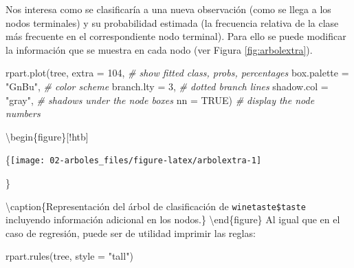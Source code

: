 \documentclass[
  spanish,
]{book}
\newenvironment{Shaded}{\begin{snugshade}}{\end{snugshade}}
\newcommand{\AttributeTok}[1]{\textcolor[rgb]{0.77,0.63,0.00}{#1}}
\newcommand{\CommentTok}[1]{\textcolor[rgb]{0.56,0.35,0.01}{\textit{#1}}}
\newcommand{\ConstantTok}[1]{\textcolor[rgb]{0.00,0.00,0.00}{#1}}
\newcommand{\DecValTok}[1]{\textcolor[rgb]{0.00,0.00,0.81}{#1}}
\newcommand{\FunctionTok}[1]{\textcolor[rgb]{0.00,0.00,0.00}{#1}}
\newcommand{\NormalTok}[1]{#1}
\newcommand{\StringTok}[1]{\textcolor[rgb]{0.31,0.60,0.02}{#1}}
\theoremstyle{break}
\theoremstyle{definition}
\theoremstyle{definition}
\theoremstyle{definition}
\theoremstyle{definition}
\theoremstyle{remark}
\begin{document}
Nos interesa como se clasificaría a una nueva observación (como se llega a los nodos terminales) y su probabilidad estimada (la frecuencia relativa de la clase más frecuente en el correspondiente nodo terminal). Para ello se puede modificar la información que se muestra en cada nodo (ver Figura \ref{fig:arbolextra}).

\begin{Shaded}
\begin{Highlighting}[]
\FunctionTok{rpart.plot}\NormalTok{(tree, }
           \AttributeTok{extra =} \DecValTok{104}\NormalTok{,          }\CommentTok{\# show fitted class, probs, percentages}
           \AttributeTok{box.palette =} \StringTok{"GnBu"}\NormalTok{, }\CommentTok{\# color scheme}
           \AttributeTok{branch.lty =} \DecValTok{3}\NormalTok{,       }\CommentTok{\# dotted branch lines}
           \AttributeTok{shadow.col =} \StringTok{"gray"}\NormalTok{,  }\CommentTok{\# shadows under the node boxes}
           \AttributeTok{nn =} \ConstantTok{TRUE}\NormalTok{)            }\CommentTok{\# display the node numbers }
\end{Highlighting}
\end{Shaded}

\textbackslash begin\{figure\}{[}!htb{]}

\{\centering \texttt{[image: 02-arboles\_files/figure-latex/arbolextra-1]}

\}

\textbackslash caption\{Representación del árbol de clasificación de \texttt{winetaste\$taste} incluyendo información adicional en los nodos.\}\label{fig:arbolextra}
\textbackslash end\{figure\}
Al igual que en el caso de regresión, puede ser de utilidad imprimir las reglas:

\begin{Shaded}
\begin{Highlighting}[]
\FunctionTok{rpart.rules}\NormalTok{(tree, }\AttributeTok{style =} \StringTok{"tall"}\NormalTok{)}
\end{Highlighting}
\end{Shaded}
\end{document}
